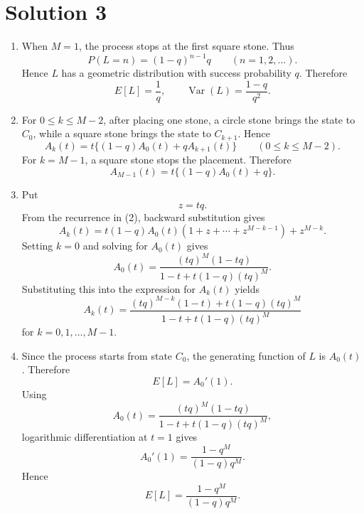 \documentclass[10pt,a4paper]{article}
\begin{document}
\section*{Solution 3}

\begin{enumerate}
  \item When $M=1$, the process stops at the first square stone. Thus
        \[
          P(L=n)=(1-q)^{n-1}q
          \qquad (n=1,2,\ldots).
        \]
        Hence $L$ has a geometric distribution with success probability $q$. Therefore
        \[
          \boxed{E[L]=\frac1q,}
          \qquad
          \boxed{\operatorname{Var}(L)=\frac{1-q}{q^2}.}
        \]

  \item For $0\leq k\leq M-2$, after placing one stone, a circle stone brings the state to $C_0$, while a square stone brings the state to $C_{k+1}$. Hence
        \[
          \boxed{
          A_k(t)=t\{(1-q)A_0(t)+qA_{k+1}(t)\}
          \qquad (0\leq k\leq M-2).}
        \]
        For $k=M-1$, a square stone stops the placement. Therefore
        \[
          \boxed{
          A_{M-1}(t)=t\{(1-q)A_0(t)+q\}.}
        \]

  \item Put
        \[
          z=tq.
        \]
        From the recurrence in (2), backward substitution gives
        \[
          A_k(t)
          =
          t(1-q)A_0(t)(1+z+\cdots+z^{M-k-1})
          +z^{M-k}.
        \]
        Setting $k=0$ and solving for $A_0(t)$ gives
        \[
          A_0(t)
          =
          \frac{(tq)^M(1-tq)}
          {1-t+t(1-q)(tq)^M}.
        \]
        Substituting this into the expression for $A_k(t)$ yields
        \[
          \boxed{
          A_k(t)=
          \frac{(tq)^{M-k}(1-t)+t(1-q)(tq)^M}
          {1-t+t(1-q)(tq)^M}}
        \]
        for $k=0,1,\ldots,M-1$.

  \item Since the process starts from state $C_0$, the generating function of $L$ is $A_0(t)$. Therefore
        \[
          E[L]=A_0'(1).
        \]
        Using
        \[
          A_0(t)=
          \frac{(tq)^M(1-tq)}
          {1-t+t(1-q)(tq)^M},
        \]
        logarithmic differentiation at $t=1$ gives
        \[
          A_0'(1)
          =
          \frac{1-q^M}{(1-q)q^M}.
        \]
        Hence
        \[
          \boxed{
          E[L]=\frac{1-q^M}{(1-q)q^M}.}
        \]
\end{enumerate}
\end{document}
